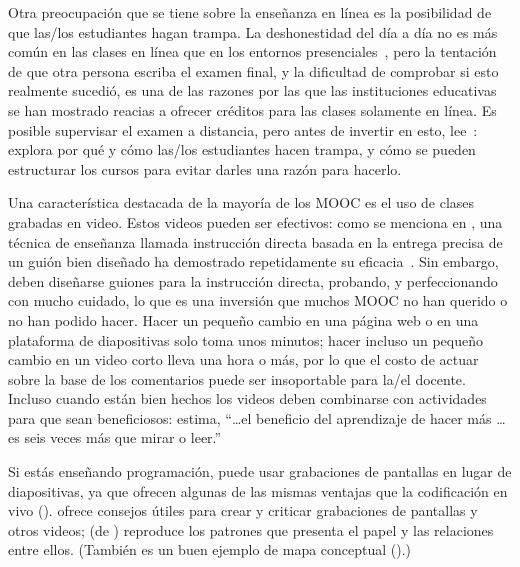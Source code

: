 Otra preocupación que se tiene sobre la enseñanza en línea es la posibilidad de que las/los estudiantes hagan trampa.
La deshonestidad del día a día no es más común en las clases en línea que en los entornos presenciales~\cite{Beck2014},
pero la tentación de que otra persona escriba el examen final,
y la dificultad de comprobar si esto realmente sucedió,
es una de las razones por las que las instituciones educativas se han mostrado reacias a ofrecer créditos para las clases solamente en línea.
Es posible supervisar el examen a distancia,
pero antes de invertir en esto,
lee~\cite{Lang2013}:
explora por qué y cómo las/los estudiantes hacen trampa,
y cómo se pueden estructurar los cursos para evitar darles una razón para hacerlo.


Una característica destacada de la mayoría de los MOOC es el uso de clases grabadas en video.
Estos videos pueden ser efectivos:
como se menciona en ,
una técnica de enseñanza llamada instrucción directa
basada en la entrega precisa de un guión bien diseñado ha demostrado repetidamente su eficacia~\cite{Stoc2018}.
Sin embargo,
deben diseñarse guiones para la instrucción directa,
probando,
y perfeccionando con mucho cuidado,
lo que es una inversión que muchos MOOC no han querido o no han podido hacer.
Hacer un pequeño cambio en una página web o en una plataforma de diapositivas solo toma unos minutos;
hacer incluso un pequeño cambio en un video corto lleva una hora o más,
por lo que el costo de actuar sobre la base de los comentarios puede ser insoportable para la/el docente.
Incluso cuando están bien hechos
los videos deben combinarse con actividades para que sean beneficiosos:
\cite{Koed2015} estima,
``{\ldots}el beneficio del aprendizaje de hacer más {\ldots} es
seis veces más que mirar o leer.''

Si estás enseñando programación,
puede usar grabaciones de pantallas en lugar de diapositivas,
ya que ofrecen algunas de las mismas ventajas que la codificación en vivo ().
\cite{Chen2009} ofrece consejos útiles para crear y criticar grabaciones de pantallas y otros videos;
 (de \cite{Chen2009}) reproduce los patrones que presenta el papel
y las relaciones entre ellos.
(También es un buen ejemplo de mapa conceptual ().)


